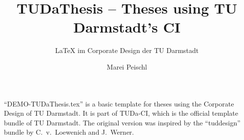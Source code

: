 \documentclass[
	english,%
	accentcolor=9c,%
	ruledheaders=section,%
	class=report,%
	thesis={type=bachelor},%
	fontsize=11pt,%
	parskip=half-,%
	custommargins=true,%
	marginpar=false,%
]{tudapub}
\title{TUDaThesis -- Theses using TU Darmstadt's CI}
\subtitle{\LaTeX{} im Corporate Design der TU Darmstadt}
\author{Marei Peischl}
\institute{Institute}
\begin{document}
\maketitle


\tableofcontents



\enquote{DEMO-TUDaThesis.tex} is a basic template for theses using the Corporate Design of TU Darmstadt.
It is part of TUDa-CI, which is the official template bundle of TU Darmstadt. The original version was inspired by the \enquote{tuddesign} bundle by C.~v.~Loewenich and J.~Werner.


\printbibliography
\end{document}
